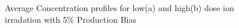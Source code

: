 \documentclass[a4paper]{article}
\begin{document}
    \begin{figure}[h!]  %
      \centering
      \qquad
      \caption{Average Concentration profiles for low(a) and high(b) dose ion irradation with 5\% Production Bias}
      \label{figure:average_concentrations_ion_5}
    \end{figure}
\end{document}
